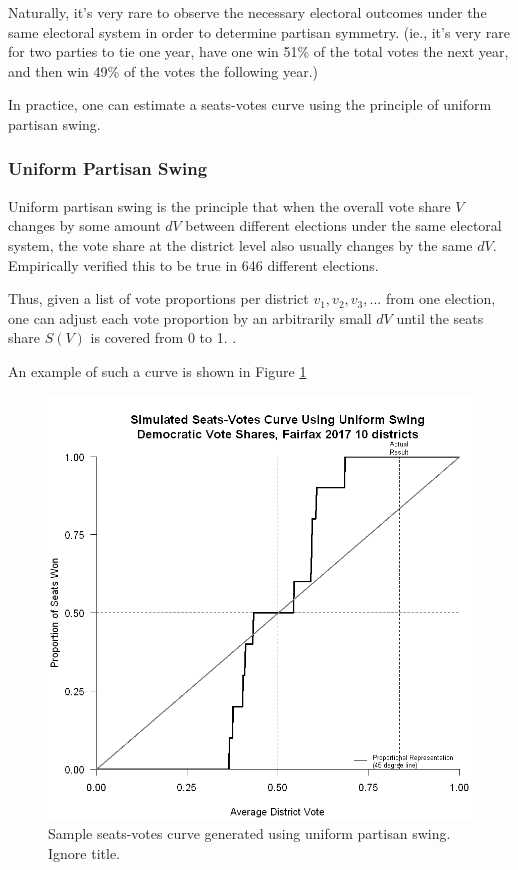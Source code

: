 Naturally, it's very rare to observe the necessary electoral outcomes under the same electoral system in order to determine partisan symmetry. (ie., it's very rare for two parties to tie one year, have one win 51\% of the total votes the next year, and then win 49\% of the votes the following year.)

In practice, one can estimate a seats-votes curve using the principle of uniform partisan swing.

\subsubsection{Uniform Partisan Swing}

Uniform partisan swing is the principle that when the overall vote share $V$ changes by some amount $dV$ between different elections under the same electoral system, the vote share at the district level also usually changes by the same $dV$. \textcite{katz2020} Empirically verified this to be true in 646 different elections. 

Thus, given a list of vote proportions per district ${v_1, v_2, v_3, ...}$ from one election, one can adjust each vote proportion by an arbitrarily small $dV$ until the seats share $S(V)$ is covered from 0 to 1. \parencite{katz2020}.

An example of such a curve is shown in Figure \ref{fig:seatsvotesups1}

\begin{figure}
    \includegraphics[width=0.5\linewidth]{img/seatsvotesups.png}
    \caption{Sample seats-votes curve generated using uniform partisan swing. Ignore title. \parencite[175]{katz2020}}
    \label{fig:seatsvotesups1}
\end{figure}

